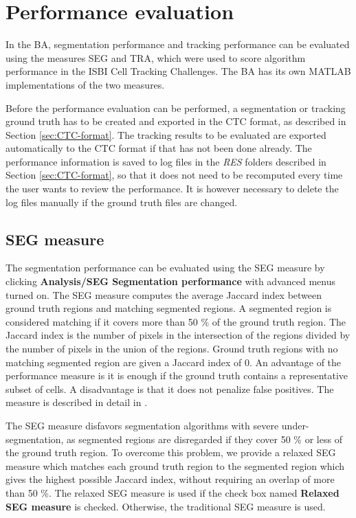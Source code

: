 \documentclass[a4paper, oneside, onecolumn, 11pt]{article}
\newcommand{\menu}[1]{\textbf{#1}}
\newcommand{\file}[1]{\emph{#1}}
\newcommand{\control}[1]{\textbf{#1}}
\begin{document}
\section{Performance evaluation}
\label{sec:performance-evaluation}
In the BA, segmentation performance and tracking performance can be evaluated using the measures SEG and TRA, which were used to score algorithm performance in the ISBI Cell Tracking Challenges. The BA has its own MATLAB implementations of the two measures.

Before the performance evaluation can be performed, a segmentation or tracking ground truth has to be created and exported in the CTC format, as described in Section \ref{sec:CTC-format}. The tracking results to be evaluated are exported automatically to the CTC format if that has not been done already. The performance information is saved to log files in the \file{RES} folders described in Section \ref{sec:CTC-format}, so that it does not need to be recomputed every time the user wants to review the performance. It is however necessary to delete the log files manually if the ground truth files are changed.

\subsection{SEG measure}
The segmentation performance can be evaluated using the SEG measure by clicking \menu{Analysis/SEG Segmentation performance} with advanced menus turned on. The SEG measure computes the average Jaccard index between ground truth regions and matching segmented regions. A segmented region is considered matching if it covers more than 50 \% of the ground truth region. The Jaccard index is the number of pixels in the intersection of the regions divided by the number of pixels in the union of the regions. Ground truth regions with no matching segmented region are given a Jaccard index of 0. An advantage of the performance measure is it is enough if the ground truth contains a representative subset of cells. A disadvantage is that it does not penalize false positives. The measure is described in detail in \cite{Maska14Benchmark, Ortiz15Challenge, Ulman17Objective}.

The SEG measure disfavors segmentation algorithms with severe under-segmentation, as segmented regions are disregarded if they cover 50 \% or less of the ground truth region. To overcome this problem, we provide a relaxed SEG measure which matches each ground truth region to the segmented region which gives the highest possible Jaccard index, without requiring an overlap of more than 50 \%. The relaxed SEG measure is used if the check box named \control{Relaxed SEG measure} is checked. Otherwise, the traditional SEG measure is used.
\end{document}
